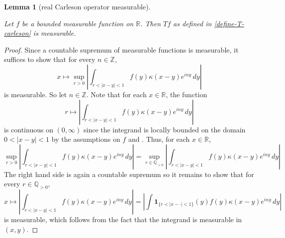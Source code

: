 \documentclass[10pt,a4paper]{article}
\theoremstyle{plain}
\newtheorem{lemma}[theorem]{Lemma}
\theoremstyle{definition}
\numberwithin{equation}{subsection}
\newcommand{\Z}{{\mathbb{Z}}}
\newcommand{\Q}{{\mathbb{Q}}}
\newcommand{\R}{{\mathbb{R}}}
\newcommand{\lean}[1]{}
\newcommand{\uses}[1]{}
\newcommand{\leanok}{}
\begin{document}
\begin{lemma}[real Carleson operator measurable]
    \label{real-Carleson-operator-measurable}
    \uses{Hilbert-kernel-bound}
    \leanok
    \lean{carlesonOperatorReal_measurable}
    Let $f$ be a bounded measurable function on $\R$. Then $Tf$ as defined in \eqref{define-T-carleson} is measurable.
\end{lemma}
\begin{proof}
    \leanok
    Since a countable supremum of measurable functions is measurable, it suffices to show that for every $n\in\Z$,
    \begin{equation*}
        x \mapsto \sup_{r>0}\left|\int_{r<|x-y|<1} f(y)\kappa(x-y) e^{iny}\, dy\right|
    \end{equation*}
    is measurable. So let $n\in\Z$.
    Note that for each $x\in\R$, the function
    \begin{equation*}
        r \mapsto \left|\int_{r<|x-y|<1} f(y)\kappa(x-y) e^{iny}\, dy\right|
    \end{equation*}
    is continuous on $(0,\infty)$ since the integrand is locally bounded on the domain $0<|x-y|<1$ by the assumptions on $f$ and .
    Thus, for each $x\in\R$,
    \begin{equation*}
        \sup_{r>0}\left|\int_{r<|x-y|<1} f(y)\kappa(x-y) e^{iny}\, dy\right|
        =\sup_{r\in\Q_{>0}}\left|\int_{r<|x-y|<1} f(y)\kappa(x-y) e^{iny}\, dy\right|
    \end{equation*}
    The right hand side is again a countable supremum so it remains to show that for every $r\in\Q_{>0}$,
    \begin{equation*}
        x \mapsto \left|\int_{r<|x-y|<1} f(y)\kappa(x-y) e^{iny}\, dy\right| = \left|\int \mathbf{1}_{\{r<|x-\cdot|<1\}}(y) f(y)\kappa(x-y) e^{iny}\, dy\right|
    \end{equation*}
    is measurable, which follows from the fact that the integrand is measurable in $(x,y)$.
\end{proof}
\end{document}
